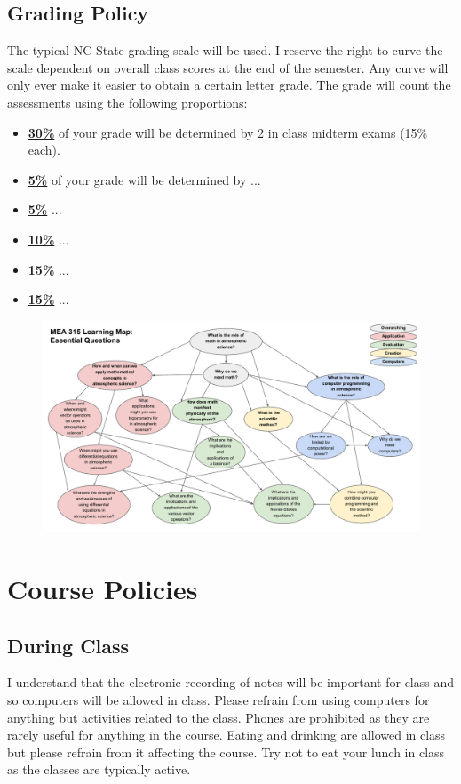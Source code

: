 \documentclass[11pt]{article}
\begin{document}
\subsection*{Grading Policy}
The typical NC State grading scale will be used. I reserve the right to curve the scale dependent on overall class scores at the end of the semester. Any curve will only ever make it easier to obtain a certain letter grade. The grade will count the assessments using the following proportions:
\begin{itemize}
	\item \underline{\textbf{30\%}} of your grade will be determined by 2 in class midterm exams (15\% each).
	\item \underline{\textbf{5\%}} of your grade will be determined by ...
	\item \underline{\textbf{5\%}} ...
    \item \underline{\textbf{10\%}}  ...
	\item \underline{\textbf{15\%}} ...
	\item \underline{\textbf{15\%}} ...
\end{itemize}


\begin{figure}
\includegraphics[width=1.3\textwidth,angle=90]{Concept_map_315.pdf}
\end{figure}


\newpage
\section*{Course Policies}

\subsection*{During Class}
\footnotesize{I understand that the electronic recording of notes will be important for class and so computers will be allowed in class. Please refrain from using computers for anything but activities related to the class. Phones are prohibited as they are rarely useful for anything in the course. Eating and drinking are allowed in class but please refrain from it affecting the course. Try not to eat your lunch in class as the classes are typically active.}
\end{document}
